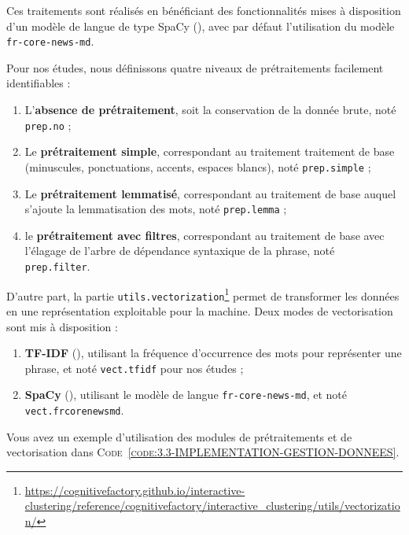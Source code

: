 		Ces traitements sont réalisés en bénéficiant des fonctionnalités mises à disposition d'un modèle de langue de type SpaCy (\cite{honnibal-montani:2017:spacy-natural-language}), avec par défaut l'utilisation du modèle \texttt{fr-core-news-md}.
		
		Pour nos études, nous définissons quatre niveaux de prétraitements facilement identifiables :
		\begin{enumerate}
			\item L'\textbf{absence de prétraitement}, soit la conservation de la donnée brute, noté \texttt{prep.no} ;
			\item Le \textbf{prétraitement simple}, correspondant au traitement traitement de base (minuscules, ponctuations, accents, espaces blancs), noté \texttt{prep.simple} ; 
			\item Le \textbf{prétraitement lemmatisé}, correspondant au traitement de base auquel s'ajoute la lemmatisation des mots, noté \texttt{prep.lemma} ;
			\item le \textbf{prétraitement avec filtres}, correspondant au traitement de base avec l'élagage de l'arbre de dépendance syntaxique de la phrase, noté \texttt{prep.filter}.
		\end{enumerate}
		
		
		D'autre part, la partie \texttt{utils.vectorization}\footnote{\url{https://cognitivefactory.github.io/interactive-clustering/reference/cognitivefactory/interactive_clustering/utils/vectorization/}} permet de transformer les données en une représentation exploitable pour la machine.
		Deux modes de vectorisation sont mis à disposition :
		\begin{enumerate}
			\item \textbf{TF-IDF} (\cite{sparck-jones:1972:statistical-interpretation-term}), utilisant la fréquence d'occurrence des mots pour représenter une phrase, et noté \texttt{vect.tfidf} pour nos études ;
			\item \textbf{SpaCy} (\cite{honnibal-montani:2017:spacy-natural-language}), utilisant le modèle de langue \texttt{fr-core-news-md}, et noté \texttt{vect.frcorenewsmd}.
		\end{enumerate}
		
		Vous avez un exemple d'utilisation des modules de prétraitements et de vectorisation dans \textsc{Code~\ref{code:3.3-IMPLEMENTATION-GESTION-DONNEES}}.
		
